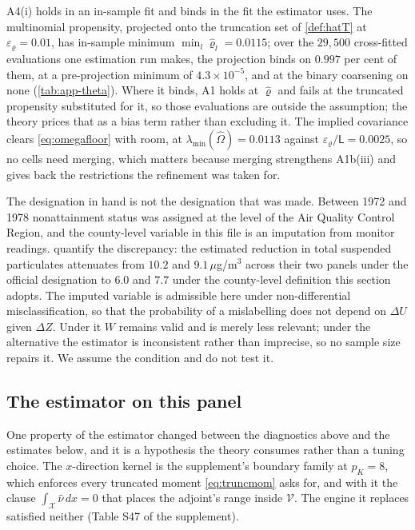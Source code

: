 \documentclass[
  12pt]{article}
\newcommand{\1}[1]{\mathds{1}\left[#1\right]}
\theoremstyle{plain}
\theoremstyle{definition}
\theoremstyle{definition}
\theoremstyle{remark}
\begin{document}
A4(i) holds in an in-sample fit and binds in the fit the estimator uses.
The multinomial propensity, projected onto the truncation set of
\cref{def:hatT} at \(\varepsilon_\varrho=0.01\), has in-sample minimum
\(\min_l\hat\varrho_l=0.0115\); over the \(29{,}500\) cross-fitted
evaluations one estimation run makes, the projection binds on \(0.997\)
per cent of them, at a pre-projection minimum of \(4.3\times10^{-5}\),
and at the binary coarsening on none (\cref{tab:app-theta}). Where it
binds, A1 holds at \(\hat\varrho\) and fails at the truncated propensity
substituted for it, so those evaluations are outside the assumption; the
theory prices that as a bias term rather than excluding it. The implied
covariance clears \eqref{eq:omegafloor} with room, at
\(\lambda_{\min}(\hat\Omega)=0.0113\) against
\(\varepsilon_\varrho/\mathsf
L=0.0025\), so no cells need merging, which matters because merging
strengthens A1b(iii) and gives back the restrictions the refinement was
taken for.

The designation in hand is not the designation that was made. Between
1972 and 1978 nonattainment status was assigned at the level of the Air
Quality Control Region, and the county-level variable in this file is an
imputation from monitor readings. \citet{cropper2023} quantify the
discrepancy: the estimated reduction in total suspended particulates
attenuates from \(10.2\) and \(9.1\,\mu\)g/m\(^{3}\) across their two
panels under the official designation to \(6.0\) and \(7.7\) under the
county-level definition this section adopts. The imputed variable is
admissible here under non-differential misclassification, so that the
probability of a mislabelling does not depend on \(\Delta U\) given
\(\Delta Z\). Under it \(W\) remains valid and is merely less relevant;
under the alternative the estimator is inconsistent rather than
imprecise, so no sample size repairs it. We assume the condition and do
not test it.

\subsection{The estimator on this
panel}\label{the-estimator-on-this-panel}

One property of the estimator changed between the diagnostics above and
the estimates below, and it is a hypothesis the theory consumes rather
than a tuning choice. The \(x\)-direction kernel is the supplement's
boundary family at \(p_K=8\), which enforces every truncated moment
\eqref{eq:truncmom} asks for, and with it the clause
\(\int_{\mathcal X}\hat\nu\,dx=0\) that places the adjoint's range
inside \(\mathcal V\). The engine it replaces satisfied neither (Table
S47 of the supplement).
\end{document}
